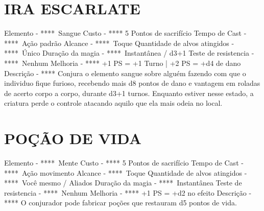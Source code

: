 \documentclass{article}%
\begin{document}
\section{IRA ESCARLATE}%
\label{sec:IRAESCARLATE}%
Elemento {-} ****~Sangue\newline%
Custo {-} **** 5 Pontos de sacrifício\newline%
Tempo de Cast {-} ****~Ação padrão\newline%
Alcance {-} ****~Toque\newline%
Quantidade de alvos atingidos {-} ****~Único\newline%
Duração da magia {-} ****~Instantânea / d3+1\newline%
Teste de resistencia {-} ****~Nenhum\newline%
Melhoria {-} **** +1 PS = +1 Turno | +2 PS = +d4 de dano\newline%
Descrição {-} **** Conjura o elemento sangue sobre alguém fazendo com que o individuo fique furioso, recebendo mais d8 pontos de dano e vantagem em roladas de acerto corpo a corpo, durante d3+1 turnos. Enquanto estiver nesse estado, a criatura perde o controle atacando aquilo que ela mais odeia no local.\newline%

%
\section{POÇÃO DE VIDA}%
\label{sec:POODEVIDA}%
Elemento {-} ****~Mente\newline%
Custo {-} **** 5 Pontos de sacrifício\newline%
Tempo de Cast {-} ****~Ação movimento\newline%
Alcance {-} ****~Toque\newline%
Quantidade de alvos atingidos {-} ****~Você mesmo / Aliados\newline%
Duração da magia {-} ****~Instantânea\newline%
Teste de resistencia {-} ****~Nenhum\newline%
Melhoria {-} **** +1 PS = +d2 no efeito\newline%
Descrição {-} **** O conjurador pode fabricar poções que restauram d5 pontos de vida.\newline%

%
\end{document}

